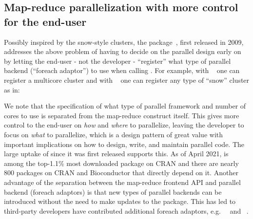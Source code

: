 \subsection{Map-reduce parallelization with more control for the end-user}
\label{map-reduce-parallelization-with-more-control-for-the-end-user}

Possibly inspired by the snow-style clusters, the 
package~\citep{CRAN:foreach,Kane_etal_2013}, first released in 2009,
addresses the above problem of having to decide on the parallel design
early on by letting the end-user - not the developer - ``register''
what type of parallel backend (``foreach adaptor'') to use when
calling . For example, with
~\citep{CRAN:doMC} one can register a multicore cluster and
with ~\citep{CRAN:doParallel} one can register any
type of ``snow'' cluster as in:
%
%
We note that the specification of what type of parallel framework and
number of cores to use is separated from the 
map-reduce construct itself. This gives more control to the end-user
on
\emph{how} and \emph{where} to parallelize, leaving the developer to
focus on \emph{what} to parallelize, which is a design pattern of
great value with important implications on how to design, write, and
maintain parallel code. The large uptake of  since it was
first released supports this. As of April 2021,  is among
the top-1.1\% most downloaded package on CRAN and there are nearly 800
packages on CRAN and Bioconductor that directly depend on it.  Another
advantage of the separation between the map-reduce frontend API and
parallel backend (foreach adaptors) is that new types of parallel
backends can be introduced without the need to make updates to
the  package. This has led to third-party developers have
contributed additional foreach adaptors,
e.g.\ ~\citep{CRAN:doMPI} and
~\citep{CRAN:doRedis}.

